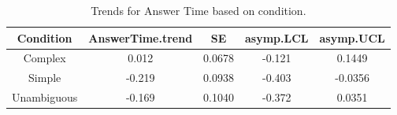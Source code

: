 \begin{table}[h!]
\centering
\begin{tabular}{|c|c|c|c|c|}
\hline
\textbf{Condition} & \textbf{AnswerTime.trend} & \textbf{SE} & \textbf{asymp.LCL} & \textbf{asymp.UCL} \\ \hline
Complex            & 0.012                     & 0.0678      & -0.121             & 0.1449             \\ \hline
Simple             & -0.219                    & 0.0938      & -0.403             & -0.0356            \\ \hline
Unambiguous        & -0.169                    & 0.1040      & -0.372             & 0.0351             \\ \hline
\end{tabular}
\caption{Trends for Answer Time based on condition.}
\label{tab:answertime_trends}
\end{table}




